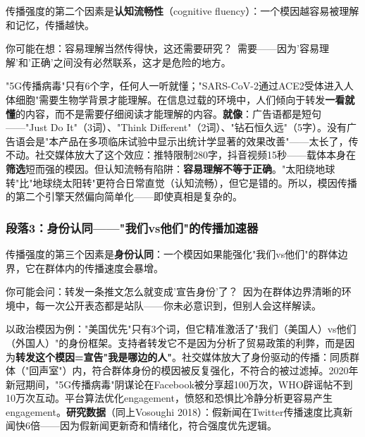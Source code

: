 \documentclass[../main.tex]{subfiles}
\begin{document}
	传播强度的第二个因素是\textbf{认知流畅性}（cognitive fluency）：一个模因越容易被理解和记忆，传播越快。

	\begin{tcolorbox}[colback=yellow!5, title=\textit{读者行为预测}]

		你可能在想：容易理解当然传得快，这还需要研究？\ 需要——因为'容易理解'和'正确'之间没有必然联系，这才是危险的地方。

	\end{tcolorbox}

"5G传播病毒"只有6个字，任何人一听就懂；"SARS-CoV-2通过ACE2受体进入人体细胞"需要生物学背景才能理解。在信息过载的环境中，人们倾向于转发\textbf{一看就懂}的内容，而不是需要仔细阅读才能理解的内容。\textbf{就像}：广告语都是短句——"Just Do It"（3词）、"Think Different"（2词）、"钻石恒久远"（5字）。没有广告语会是"本产品在多项临床试验中显示出统计学显著的效果改善"——太长了，传不动。社交媒体放大了这个效应：推特限制280字，抖音视频15秒——载体本身在\textbf{筛选}短而强的模因。但认知流畅有陷阱：\textbf{容易理解不等于正确}。"太阳绕地球转"比"地球绕太阳转"更符合日常直觉（认知流畅），但它是错的。所以，模因传播的第二个引擎天然偏向简单化——即使真相是复杂的。

	\subsubsection*{段落3：身份认同——"我们vs他们"的传播加速器}

	传播强度的第三个因素是\textbf{身份认同}：一个模因如果能强化"我们vs他们"的群体边界，它在群体内的传播速度会暴增。

	\begin{tcolorbox}[colback=yellow!5, title=\textit{读者行为预测}]

		你可能会问：转发一条推文怎么就变成'宣告身份'了？\ 因为在群体边界清晰的环境中，每一次公开表态都是站队——你未必意识到，但别人会这样解读。

	\end{tcolorbox}

以政治模因为例："美国优先"只有3个词，但它精准激活了"我们（美国人）vs他们（外国人）"的身份框架。支持者转发它不是因为分析了贸易政策的利弊，而是因为\textbf{转发这个模因=宣告"我是哪边的人"}。社交媒体放大了身份驱动的传播：同质群体（"回声室"）内，符合群体身份的模因被反复强化，不符合的被过滤掉。2020年新冠期间，"5G传播病毒"阴谋论在Facebook被分享超100万次，WHO辟谣帖不到10万次互动。平台算法优化engagement，愤怒和恐惧比冷静分析更容易产生engagement。\textbf{研究数据}（同上Vosoughi 2018）：假新闻在Twitter传播速度比真新闻快6倍——因为假新闻更新奇和情绪化，符合强度优先逻辑。
\end{document}
